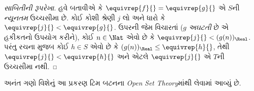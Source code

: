 \begin{proof}[સાબિતીની રૂપરેખા]
હવે બતાવીએ કે $\equivrep{f}{} = \equivrep{g}{}$ એ $S$ની
\emph{ન્યૂનતમ} ઉચ્ચસીમા છે. કોઈ કોશી શ્રેણી $j$ લો અને ધારો કે
$\equivrep{j}{} < \equivrep{g}{}$. ઉપરની જેમ વિચારતાં ($g$
\emph{અઘટતી} છે એ હકીકતનો ઉપયોગ કરીને), કોઈ $n \in \Nat$ એવો છે કે
$\equivrep{j}{} < (g(n))_\Real$. પરંતુ રચના મુજબ કોઈ $h \in S$ એવો
છે કે $(g(n))_\Real \leq \equivrep{h}{}$, તેથી $\equivrep{j}{} <
\equivrep{h}{}$ અને એટલે $\equivrep{j}{}$ એ $T$ની ઉચ્ચસીમા નથી.
\end{proof}
\endgroup


\OLEndChapterHook
\endgroup


\begingroup
\makeatletter{}\makeatother

\label{guunit:OLP-0049}


\begin{editorial}
અનંત ગણો વિશેનું આ પ્રકરણ ટિમ બટનના \emph{Open Set Theory}માંથી
લેવામાં આવ્યું છે.
\end{editorial}

\begingroup
\makeatletter{}\makeatother

\label{guunit:OLP-0050}


